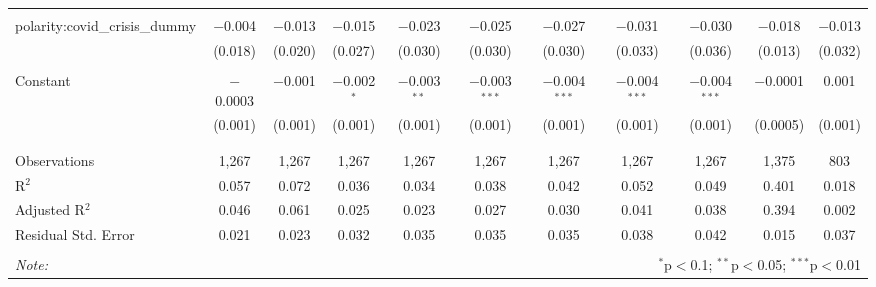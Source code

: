 \begin{table}[!htbp]
\begin{adjustbox}{width=1.25\textwidth}
\begin{tabular}{@{\extracolsep{5pt}}lcccccccccc}
  & & & & & & & & & & \\ 
 polarity:covid\_crisis\_dummy & $-$0.004 & $-$0.013 & $-$0.015 & $-$0.023 & $-$0.025 & $-$0.027 & $-$0.031 & $-$0.030 & $-$0.018 & $-$0.013 \\ 
  & (0.018) & (0.020) & (0.027) & (0.030) & (0.030) & (0.030) & (0.033) & (0.036) & (0.013) & (0.032) \\ 
  & & & & & & & & & & \\ 
 Constant & $-$0.0003 & $-$0.001 & $-$0.002$^{*}$ & $-$0.003$^{**}$ & $-$0.003$^{***}$ & $-$0.004$^{***}$ & $-$0.004$^{***}$ & $-$0.004$^{***}$ & $-$0.0001 & 0.001 \\ 
  & (0.001) & (0.001) & (0.001) & (0.001) & (0.001) & (0.001) & (0.001) & (0.001) & (0.0005) & (0.001) \\ 
  & & & & & & & & & & \\ 
\hline \\[-1.8ex] 
Observations & 1,267 & 1,267 & 1,267 & 1,267 & 1,267 & 1,267 & 1,267 & 1,267 & 1,375 & 803 \\ 
R$^{2}$ & 0.057 & 0.072 & 0.036 & 0.034 & 0.038 & 0.042 & 0.052 & 0.049 & 0.401 & 0.018 \\ 
Adjusted R$^{2}$ & 0.046 & 0.061 & 0.025 & 0.023 & 0.027 & 0.030 & 0.041 & 0.038 & 0.394 & 0.002 \\ 
Residual Std. Error & 0.021 & 0.023 & 0.032 & 0.035 & 0.035 & 0.035 & 0.038 & 0.042 & 0.015 & 0.037 \\ 
\hline 
\hline \\[-1.8ex] 
\textit{Note:}  & \multicolumn{10}{r}{$^{*}$p$<$0.1; $^{**}$p$<$0.05; $^{***}$p$<$0.01} \\ 
\end{tabular} 
\end{adjustbox} 
\end{table} 
